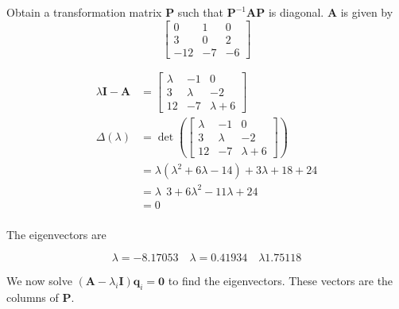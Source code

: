 \item Obtain a transformation matrix $\mathbf{P}$
such that $\mathbf{P}^{-1} \mathbf{A} \mathbf{P}$ is diagonal.
$\mathbf{A}$ is given by
\begin{equation*}
 \begin{bmatrix}
  0 & 1 & 0\\
  3 & 0 & 2\\
  -12 & -7 & -6
 \end{bmatrix}
\end{equation*}

\begin{align*}
 \lambda \mathbf{I} - \mathbf{A}  &= \begin{bmatrix}
                                    \lambda & -1 & 0\\
                                    3 & \lambda & -2 \\
                                    12 & -7& \lambda+6
                                     \end{bmatrix}\\
\Delta (\lambda) &= \det \left(
\begin{bmatrix}
                                    \lambda & -1 & 0\\
                                    3 & \lambda & -2 \\
                                    12 & -7& \lambda+6
                                     \end{bmatrix}
\right)\\
&= \lambda(\lambda^2 + 6 \lambda -14) +3\lambda +18+24\\
&= \lambda~~3 +6\lambda^2 -11\lambda +24\\
&= 0\\
\end{align*}

The eigenvectors are

\begin{equation*}
 \lambda = -8.17053 \quad \lambda = 0.41934 \quad \lambda 1.75118
\end{equation*}

We now solve $(\mathbf{A} - \lambda_i \mathbf{I})\mathbf{q}_ i = \mathbf{0}$ to
find the eigenvectors.
These vectors are the columns of $\mathbf{P}$.

